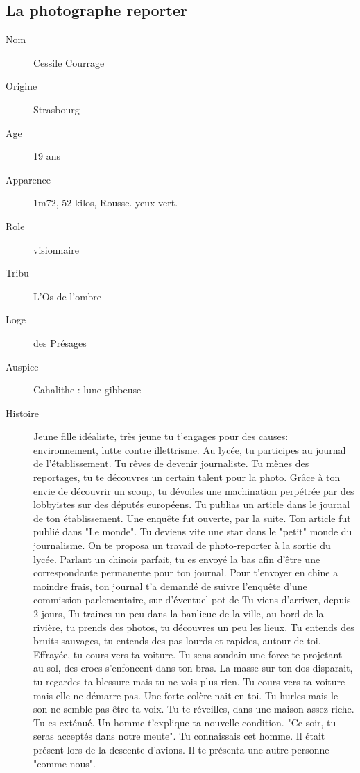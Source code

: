 \documentclass[oneside,12pt]{book}
\begin{document}
\begin{flushleft}
\subsection{La photographe reporter}
\begin{description}
\item[Nom]{ Cessile Courrage}
\item[Origine]{ Strasbourg}
\item[Age]{ 19 ans}
\item[Apparence]{1m72, 52 kilos, Rousse. yeux vert.}
\item[Role]{ visionnaire}
\item[Tribu]{L'Os de l'ombre}
\item[Loge]{des Présages}
\item[Auspice]{Cahalithe : lune gibbeuse}
\item[Histoire]{Jeune fille idéaliste, très jeune tu t'engages pour des causes: environnement, lutte contre illettrisme. Au lycée, tu participes au journal de l'établissement. Tu rêves de devenir journaliste. Tu mènes des reportages, tu te découvres un certain talent pour la photo. Grâce à ton envie de découvrir un scoup, tu dévoiles une machination perpétrée par des lobbyistes sur des députés européens. Tu publias un article dans le journal de ton établissement. Une enquête fut ouverte, par la suite. Ton article fut publié dans "Le monde". Tu deviens vite une star dans le "petit" monde du journalisme. On te proposa un travail de photo-reporter à la sortie du lycée. Parlant un chinois parfait, tu es envoyé la bas afin d'être une correspondante permanente pour ton journal. Pour t'envoyer en chine a moindre frais, ton journal t'a demandé de suivre l'enquête d'une commission parlementaire, sur d'éventuel pot de
Tu viens d'arriver, depuis 2 jours, Tu traines un peu dans la banlieue de la ville, au bord de la rivière, tu prends des photos, tu découvres un peu les lieux. Tu entends des bruits sauvages, tu entends des pas lourds et rapides, autour de toi. Effrayée, tu cours vers ta voiture. Tu sens soudain une force te projetant au sol, des crocs s'enfoncent dans ton bras. La masse sur ton dos disparait, tu regardes ta blessure mais tu ne vois plus rien. Tu cours vers ta voiture mais elle ne démarre pas. Une forte colère nait en toi. Tu hurles mais le son ne semble pas être ta voix. Tu te réveilles, dans une maison assez riche. Tu es exténué. Un homme t'explique ta nouvelle condition. "Ce soir, tu seras acceptés dans notre meute". Tu connaissais cet homme. Il était présent lors de la descente d'avions. Il te présenta une autre personne "comme nous". }
\end{description}
\clearpage



\end{flushleft}
\end{document}
